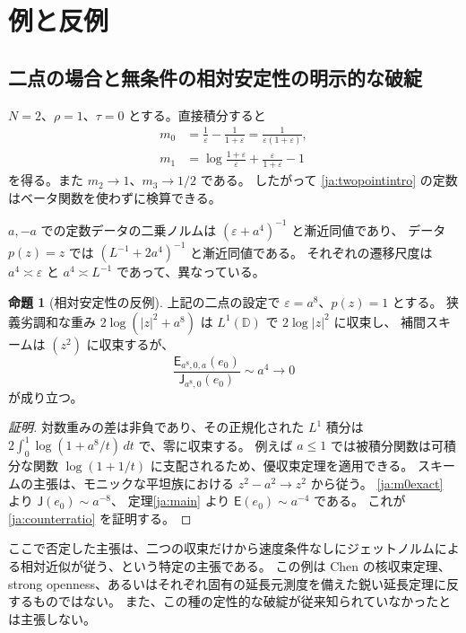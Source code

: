 \documentclass[12pt]{amsart}
\theoremstyle{definition}
\theoremstyle{remark}
\numberwithin{equation}{section}
\newcommand{\D}{\mathbb{D}}
\newcommand{\Cost}{\mathsf E}
\newcommand{\JetCost}{\mathsf J}
\theoremstyle{definition}
\newtheorem{jprop}[thm]{命題}
\begin{document}
\section{例と反例}
\subsection{二点の場合と無条件の相対安定性の明示的な破綻}
$N=2$、$\rho=1$、$\tau=0$ とする。直接積分すると
\begin{align}
 m_0&=\frac1\varepsilon-\frac1{1+\varepsilon}
     =\frac1{\varepsilon(1+\varepsilon)},\label{ja:m0exact}\\
 m_1&=\log\frac{1+\varepsilon}{\varepsilon}
       +\frac\varepsilon{1+\varepsilon}-1\label{ja:m1exact}
\end{align}
を得る。また $m_2\to1$、$m_3\to1/2$ である。
したがって \eqref{ja:twopointintro} の定数はベータ関数を使わずに検算できる。

$a,-a$ での定数データの二乗ノルムは $(\varepsilon+a^4)^{-1}$ と漸近同値であり、
データ $p(z)=z$ では $(L^{-1}+2a^4)^{-1}$ と漸近同値である。
それぞれの遷移尺度は $a^4\asymp\varepsilon$ と $a^4\asymp L^{-1}$ であって、異なっている。

\begin{jprop}[相対安定性の反例]\label{ja:counterexample}
上記の二点の設定で $\varepsilon=a^8$、$p(z)=1$ とする。
狭義劣調和な重み $2\log(|z|^2+a^8)$ は $L^1(\D)$ で $2\log|z|^2$ に収束し、
補間スキームは $(z^2)$ に収束するが、
\begin{equation}\label{ja:counterratio}
 \frac{\Cost_{a^8,0,a}(e_0)}{\JetCost_{a^8,0}(e_0)}
 \sim a^4\longrightarrow0
\end{equation}
が成り立つ。
\end{jprop}
\begin{proof}[証明]
対数重みの差は非負であり、その正規化された $L^1$ 積分は
$2\int_0^1\log(1+a^8/t)\,dt$ で、零に収束する。
例えば $a\le1$ では被積分関数は可積分な関数 $\log(1+1/t)$ に支配されるため、優収束定理を適用できる。
スキームの主張は、モニックな平坦族における $z^2-a^2\to z^2$ から従う。
\eqref{ja:m0exact} より $\JetCost(e_0)\sim a^{-8}$、
定理\ref{ja:main} より $\Cost(e_0)\sim a^{-4}$ である。
これが \eqref{ja:counterratio} を証明する。
\end{proof}
ここで否定した主張は、二つの収束だけから速度条件なしにジェットノルムによる相対近似が従う、という特定の主張である。
この例は Chen の核収束定理、strong openness、あるいはそれぞれ固有の延長元測度を備えた鋭い延長定理に反するものではない。
また、この種の定性的な破綻が従来知られていなかったとは主張しない。
\end{document}
